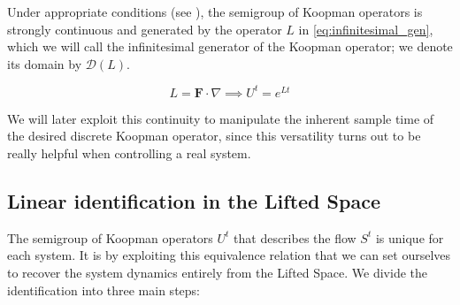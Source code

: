 \documentclass{article}
\begin{document}
        Under appropriate conditions (see \cite{Goncalves}), the semigroup of Koopman operators is strongly continuous and generated by the operator $L$ in \ref{eq:infinitesimal_gen}, which we will call the infinitesimal generator of the Koopman operator; we denote its domain by $\mathcal{D} \left(L\right)$.

        \begin{equation} \label{eq:infinitesimal_gen}
            L = \mathbf{F} \cdot \nabla \implies U^t = e^{Lt}
        \end{equation}

        We will later exploit this continuity to manipulate the inherent sample time of the desired discrete Koopman operator, since this versatility turns out to be really helpful when controlling a real system.

    \subsection{Linear identification in the Lifted Space}

        The semigroup of Koopman operators $U^t$ that describes the flow $S^t$ is unique for each system. It is by exploiting this equivalence relation that we can set ourselves to recover the system dynamics entirely from the Lifted Space. We divide the identification into three main steps:
\end{document}
